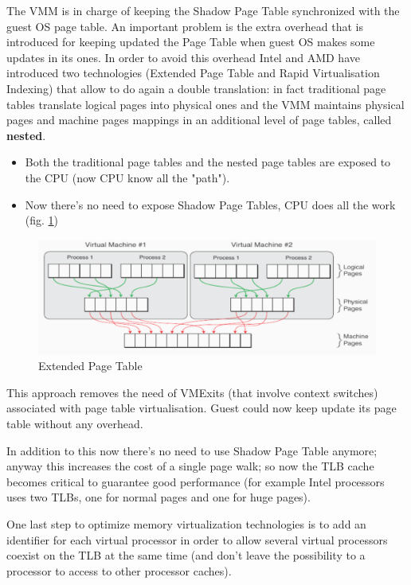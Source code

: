 The VMM is in charge of keeping the Shadow Page Table synchronized with the guest OS page table.
An important problem is the extra overhead that is introduced for keeping updated the Page Table when guest OS makes some updates in its ones. In order to avoid this overhead Intel and AMD have introduced two technologies (Extended Page Table and Rapid Virtualisation Indexing) that allow to do again a double translation: in fact traditional page tables translate logical pages into physical ones and the VMM maintains physical pages and machine pages mappings in an additional level of page tables, called \textbf{nested}.
\begin{itemize}
    \item Both the traditional page tables and the nested page tables are exposed to the CPU (now CPU know all the "path").
    \item Now there's no need to expose Shadow Page Tables, CPU does all the work (fig. \ref{fig:mapping3_mm})
\end{itemize}
\begin{figure}[h!]
    \centering
    \includegraphics[scale=0.3]{images/mapping3_mm.png}
    \caption{Extended Page Table}
    \label{fig:mapping3_mm}
\end{figure}

This approach removes the need of VMExits (that involve context switches) associated with page table virtualisation. Guest could now keep update its page table without any overhead.

In addition to this now there's no need to use Shadow Page Table anymore; anyway this increases the cost of a single page walk; so now the TLB cache becomes critical to guarantee good performance (for example Intel processors uses two TLBs, one for normal pages and one for huge pages).

One last step to optimize memory virtualization technologies is to add an identifier for each virtual processor in order to allow several virtual processors coexist on the TLB at the same time (and don't leave the possibility to a processor to access to other processor caches).


